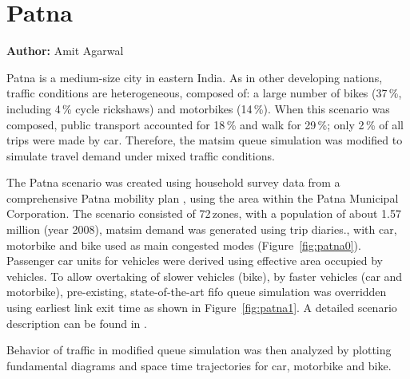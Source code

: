 \section{Patna}
\label{sec:patna}
\hfill \textbf{Author:} Amit Agarwal

Patna is a medium-size city in eastern India. As in other developing nations, traffic conditions are heterogeneous, composed of: a large number of bikes (37\,\%, including 4\,\% cycle rickshaws) and motorbikes (14\,\%). When this scenario was composed, public transport accounted for 18\,\% and walk for 29\,\%; only 2\,\% of all trips were made by car. Therefore, the \gls{matsim} queue simulation was modified to simulate travel demand under mixed traffic conditions.

The Patna scenario was created using household survey data from a comprehensive Patna mobility plan \citep[][]{TrippItransVks2009PatnaReport}, using the area within the Patna Municipal Corporation. The scenario consisted of 72\,zones, with a population of about 1.57\,million (year 2008), \gls{matsim} demand was generated using trip diaries., with car, motorbike and bike used as main congested modes (Figure~\ref{fig:patna0}). Passenger car units for vehicles were derived using effective area occupied by vehicles. To allow overtaking of slower vehicles (bike), by faster vehicles (car and motorbike), pre-existing, state-of-the-art \gls{fifo} queue simulation was overridden using earliest link exit time as shown in Figure~\ref{fig:patna1}. A detailed scenario description can be found in \citet[][]{AgarwalEtcMixedTraffic}.

Behavior of traffic in modified queue simulation was then analyzed by plotting fundamental diagrams and space time trajectories for car, motorbike and bike.


